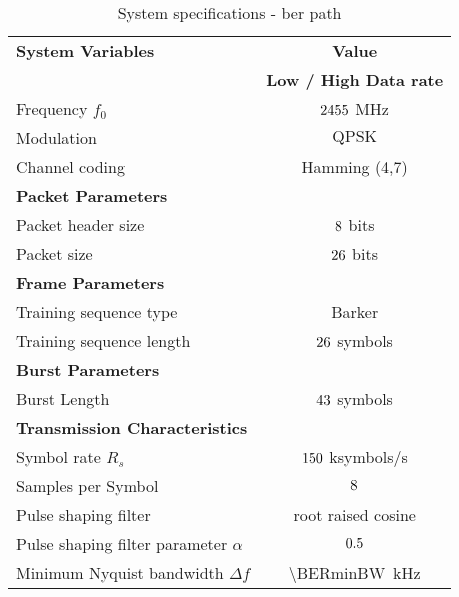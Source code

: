 \begin{table}[htbp]
  \centering
  \caption{System specifications - ber path}
    \begin{tabular}{lc}
    \rowcolor[rgb]{ 0,  0,  0} \textcolor[rgb]{ 1,  1,  1}{\textbf{System Variables}}	& \textcolor[rgb]{ 1,  1,  1}{\textbf{Value}} 		\\
    \rowcolor[rgb]{ 0,  0,  0} \textcolor[rgb]{ 1,  1,  1}{} & \textcolor[rgb]{ 1,  1,  1}{\textbf{Low / High Data rate}} 				\\
    	Frequency $f_0$ 								& $2455$ MHz 							\\
    	Modulation 									& $\text{QPSK}$									\\
    	Channel coding 								& Hamming (4,7) 									\\

    \rowcolor[rgb]{ 0,  0,  0} \textcolor[rgb]{ 1,  1,  1}{\textbf{Packet Parameters}} & \textcolor[rgb]{ 1,  1,  1}{} 				\\
	Packet header size      							& $8 $  bits								\\
    	Packet size									& $26$  bits					 			\\
    
    \rowcolor[rgb]{ 0,  0,  0} \textcolor[rgb]{ 1,  1,  1}{\textbf{Frame Parameters}} & \textcolor[rgb]{ 1,  1,  1}{} 				\\
    	Training sequence type 							& Barker										 	\\
    	Training sequence length							& $26$ symbols 					 		\\
	
    \rowcolor[rgb]{ 0,  0,  0} \textcolor[rgb]{ 1,  1,  1}{\textbf{Burst Parameters}} & \textcolor[rgb]{ 1,  1,  1}{} 					\\
    	Burst Length									& $43 $ symbols							\\
	
    \rowcolor[rgb]{ 0,  0,  0} \textcolor[rgb]{ 1,  1,  1}{\textbf{Transmission Characteristics}} & \textcolor[rgb]{ 1,  1,  1}{} 		\\
    	Symbol rate $R_s$ 								& $150$ ksymbols/s 						\\
    	Samples per Symbol 					& $8$													\\

    	Pulse shaping filter 								& root raised cosine 									\\
    	Pulse shaping filter parameter $\alpha$ 				& $0.5$											\\
    	Minimum Nyquist bandwidth $\Delta f$ 				& \SI{\BERminBW}{kHz} 					\\
    \end{tabular}
  \label{tab:specs_ber}
\end{table}


